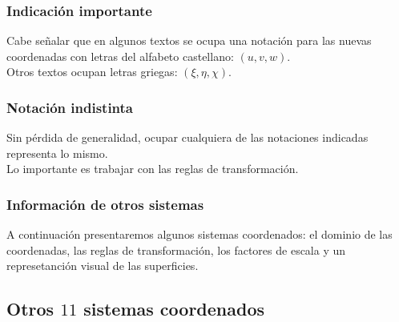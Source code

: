 \documentclass[12pt]{beamer}
\begin{document}
\begin{frame}
\frametitle{Indicación importante}
Cabe señalar que en algunos textos se ocupa una notación para las nuevas coordenadas con letras del alfabeto castellano: $(u,v,w)$.
\\
\bigskip
\pause
Otros textos ocupan letras griegas: $(\xi, \eta, \chi)$.
\end{frame}
\begin{frame}
\frametitle{Notación indistinta}
Sin pérdida de generalidad, ocupar cualquiera de las notaciones indicadas representa lo mismo.
\\
\bigskip
\pause
Lo importante es trabajar con las reglas de transformación.
\end{frame}
\begin{frame}
\frametitle{Información de otros sistemas}
A continuación presentaremos algunos sistemas coordenados: el dominio de las coordenadas, las reglas de transformación, los factores de escala y un represetanción visual de las superficies.
\end{frame}

\subsection{Otros \texorpdfstring{$11$}{11} sistemas coordenados}
\end{document}
